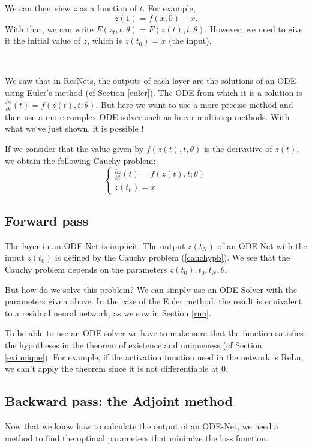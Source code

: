 \documentclass[10pt,a4paper]{article}
\theoremstyle{definition}
\theoremstyle{definition}
\theoremstyle{definition}
\begin{document}
We can then view $z$ as a function of $t$. For example,
\begin{equation*}
z(1) = f(x, 0) + x.
\end{equation*}
With that, we can write $F(z_t, t, \theta) = F(z(t), t, \theta)$. However, we need to give it the initial value of $z$, which is $z(t_0) = x$ (the input).

~

We saw that in ResNets, the outputs of each layer are the solutions of an ODE using Euler's method (cf Section \ref{euler}). The ODE from which it is a solution is $\frac{\partial z}{\partial t}(t) = f(z(t),t;\theta)$. But here we want to use a more precise method and then use a more complex ODE solver such as linear multistep methods. With what we've just shown, it is possible !

If we consider that the value given by $f(z(t), t, \theta)$ is the derivative of $z(t)$, we obtain the following Cauchy problem:
\begin{equation}
\label{cauchypb}
\begin{cases}
\frac{\partial z}{\partial t}(t) =  f(z(t), t; \theta) \\
z(t_0) =  x
\end{cases}
\end{equation}


\subsection{Forward pass}

The layer in an ODE-Net is implicit. The output $z(t_N)$ of an ODE-Net with the input $z(t_0)$ is defined by the Cauchy problem (\ref{cauchypb}). We see that the Cauchy problem depends on the parameters $z(t_0),t_0,t_N,\theta$.

But how do we solve this problem? We can simply use an ODE Solver with the parameters given above. In the case of the Euler method, the result is equivalent to a residual neural network, as we saw in Section \ref{rnn}.

To be able to use an ODE solver we have to make sure that the function satisfies the hypotheses in the theorem of existence and uniqueness (cf Section \ref{exiunique}). For example, if the activation function used in the network is ReLu, we can't apply the theorem since it is not differentiable at $0$.

\subsection{Backward pass: the Adjoint method}
Now that we know how to calculate the output of an ODE-Net, we need a method to find the optimal parameters that minimize the loss function.
\end{document}
